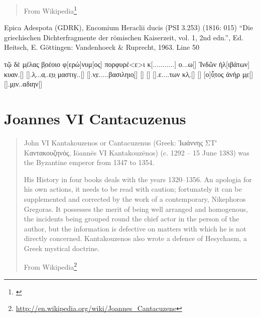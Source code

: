 \documentclass[12pt,letterpaper,twoside,final]{memoir}
\begin{document}
\blockquote[From Wikipedia\footnote{\url{}}]{}

\begin{greek}
Epica Adespota (GDRK), Encomium Heraclii ducis (PSI 3.253) (1816: 015)
“Die griechischen Dichterfragmente der römischen Kaiserzeit, vol. 1, 2nd edn.”, Ed. Heitsch, E.
Göttingen: Vandenhoeck \& Ruprecht, 1963.
Line 50

τῷ δὲ μ̣έλας β̣οέοιο φ[ερώ]νυμ[ος] 
πορφυρέ<ε>ι κ[...........] ο...ω[] 
Ἰνδῶν ἠλ[ιβάτων] 
κυαν.[] 
[].λ̣...α̣..ε̣υ̣ μαστιγ..[] 
[].ν̣ε.....βασιληιο̣[] 
[] 
[] 
[].ε....των κλ̣.[] 
[] 
[ο]ὗ̣τος ἀνὴρ μ̣ε[] 
[].μ̣ιν..αδιην[] 

\end{greek}


\section{Joannes VI Cantacuzenus}
\blockquote[From Wikipedia\footnote{\url{http://en.wikipedia.org/wiki/Joannes_Cantacuzene}}]{John VI Kantakouzenos or Cantacuzenus (Greek: Ἰωάννης ΣΤʹ Καντακουζηνός, Iōannēs VI Kantakouzēnos) (c. 1292 – 15 June 1383) was the Byzantine emperor from 1347 to 1354.

His History in four books deals with the years 1320–1356. An apologia for his own actions, it needs to be read with caution; fortunately it can be supplemented and corrected by the work of a contemporary, Nikephoros Gregoras. It possesses the merit of being well arranged and homogenous, the incidents being grouped round the chief actor in the person of the author, but the information is defective on matters with which he is not directly concerned. Kantakouzenos also wrote a defence of Hesychasm, a Greek mystical doctrine.}
\end{document}
